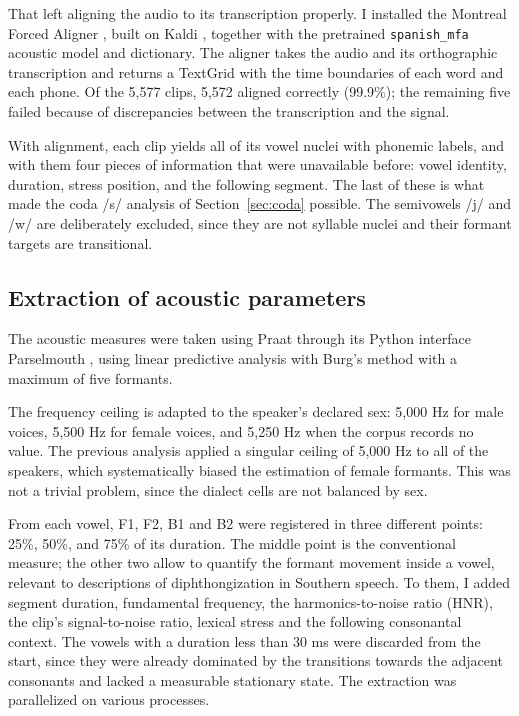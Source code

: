 \documentclass[11pt]{article}
\begin{document}
That left aligning the audio to its transcription properly. I installed the
Montreal Forced Aligner \citep{mcauliffe2017}, built on Kaldi \citep{povey2011},
together with the pretrained \texttt{spanish\_mfa} acoustic model and dictionary.
The aligner takes the audio and its orthographic transcription and returns a
TextGrid with the time boundaries of each word and each phone. Of the 5,577
clips, 5,572 aligned correctly (99.9\%); the remaining five failed because of
discrepancies between the transcription and the signal.

With alignment, each clip yields all of its vowel nuclei with phonemic labels,
and with them four pieces of information that were unavailable before: vowel
identity, duration, stress position, and the following segment. The last of these
is what made the coda /s/ analysis of Section~\ref{sec:coda} possible. The
semivowels /j/ and /w/ are deliberately excluded, since they are not syllable
nuclei and their formant targets are transitional.

\subsection{Extraction of acoustic parameters}

The acoustic measures were taken using Praat \citep{boersma2021} through its
Python interface Parselmouth \citep{jadoul2018}, using linear predictive analysis
with Burg's method with a maximum of five formants.

The frequency ceiling is adapted to the speaker's declared sex: 5,000 Hz for male
voices, 5,500 Hz for female voices, and 5,250 Hz when the corpus records no
value. The previous analysis applied a singular ceiling of 5,000 Hz to all of the
speakers, which systematically biased the estimation of female formants. This was
not a trivial problem, since the dialect cells are not balanced by sex.

From each vowel, F1, F2, B1 and B2 were registered in three different points:
25\%, 50\%, and 75\% of its duration. The middle point is the conventional
measure; the other two allow to quantify the formant movement inside a vowel,
relevant to descriptions of diphthongization in Southern speech. To them, I added
segment duration, fundamental frequency, the harmonics-to-noise ratio (HNR), the
clip's signal-to-noise ratio, lexical stress and the following consonantal
context. The vowels with a duration less than 30 ms were discarded from the
start, since they were already dominated by the transitions towards the adjacent
consonants and lacked a measurable stationary state. The extraction was
parallelized on various processes.
\end{document}
